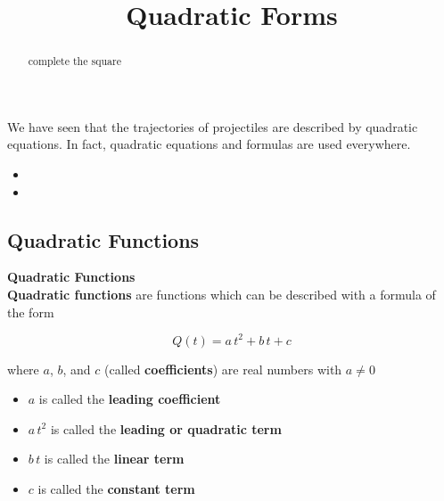 \documentclass{ximera}
\title{Quadratic Forms}
\begin{document}
\begin{abstract}
complete the square
\end{abstract}
\maketitle



We have seen that the trajectories of projectiles are described by quadratic equations.  In fact, quadratic equations and formulas are used everywhere.


\begin{itemize}
\item {}
\item {}
\end{itemize}







\subsection*{Quadratic Functions}


\begin{definition} \textbf{\textcolor{green!50!black}{Quadratic Functions}} \\
\textbf{Quadratic functions} are functions which can be described with a formula of the form

\[  Q(t) = a \, t^2 + b \, t + c  \]

where $a$, $b$, and $c$ (called \textbf{coefficients}) are real numbers with $a \ne 0$



\begin{itemize}
\item $a$ is called the \textbf{leading coefficient} 
\item $a \, t^2$ is called the \textbf{leading or quadratic term} 
\item $b \, t$ is called the \textbf{linear term} 
\item $c$ is called the \textbf{constant term} 
\end{itemize}

\end{definition}
\end{document}
